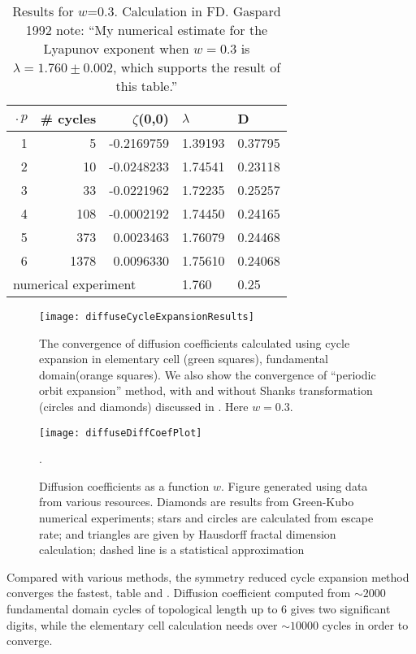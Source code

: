 \begin{table}[htbp]
\hfill
\begin{tabular}{|r|r|r|l|l|}
\hline
$\period{p}$ & \# cycles & $\zeta$(0,0) & $\lambda$ & D \\ \hline\hline
1      & 5      & -0.2169759 & 1.39193 & 0.37795 \\
2      & 10     & -0.0248233 & 1.74541 & 0.23118 \\
3      & 33     & -0.0221962 & 1.72235 & 0.25257 \\
4      & 108    & -0.0002192 & 1.74450 & 0.24165 \\
5      & 373    &  0.0023463 & 1.76079 & 0.24468 \\
6      & 1378   &  0.0096330 & 1.75610 & 0.24068 \\ \hline\hline
\multicolumn{3}{|l|}{numerical experiment}
                             & 1.760   & 0.25
\\ \hline
\end{tabular}
\caption{\label{TCELL2}
  Results for $w$=0.3. Calculation in FD. Gaspard 1992 note: ``My
  numerical estimate for the Lyapunov exponent when $w=0.3$ is
  $\lambda = 1.760 \pm 0.002$, which supports the result of this
  table.''
}
\end{table}

\begin{figure}[htbp]
  \texttt{[image: diffuseCycleExpansionResults]}
  \caption[]{\label{fig-convergence}
  The convergence of diffusion coefficients  calculated using cycle
  expansion in elementary cell (green squares),  fundamental
  domain(orange squares). We  also show the convergence of ``periodic
  orbit expansion'' method, with and  without Shanks transformation
  (circles and diamonds) discussed in  . Here $w =
  0.3$.
  }
\end{figure}

\begin{figure}
\texttt{[image: diffuseDiffCoefPlot]}
  \caption[]{\label{fig-results} Diffusion coefficients as a function
  $w$.  Figure generated using data from various resources. Diamonds
  are results from  Green-Kubo numerical experiments;
  stars and  circles are calculated from
  escape rate; and triangles are  given by Hausdorff fractal dimension
  calculation; dashed line  is a statistical
  approximation}.
\end{figure}


Compared with various methods, the symmetry reduced cycle expansion
method converges the fastest, table  and
. Diffusion coefficient computed from
$\sim2000$ fundamental domain cycles of topological length up to 6
gives two significant digits, while the elementary cell calculation
needs over $\sim 10000$ cycles in order to converge.

